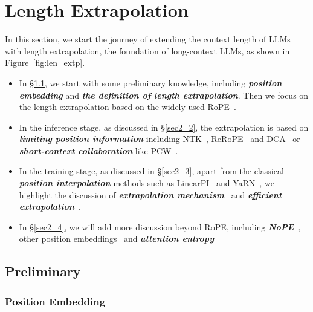 \section{Length Extrapolation}\label{sec2}



In this section, we start the journey of extending the context length of LLMs with length extrapolation, the foundation of long-context LLMs, as shown in Figure~\ref{fig:len_extp}. 
\begin{itemize}
    \item In \S\ref{sec2_1}, we start with some preliminary knowledge, including \textbf{\textit{position embedding}} and \textbf{\textit{the definition of length extrapolation}}. Then we focus on the length extrapolation based on the widely-used RoPE~\citep{su2024roformer}. 
    \item In the inference stage, as discussed in \S\ref{sec2_2}, the extrapolation is based on \textbf{\textit{limiting position information}} including NTK~\citep{dynamicNTK}, ReRoPE~\citep{rerope} and DCA~\citep{an2024training} or \textbf{\textit{short-context collaboration}} like PCW~\citep{ratner2022parallel}. 
    \item In the training stage, as discussed in \S\ref{sec2_3}, apart from the classical \textbf{\textit{position interpolation}} methods such as LinearPI~\citep{chen2023extending} and YaRN~\citep{pengyarn}, we highlight the discussion of \textbf{\textit{extrapolation mechanism}}~\citep{liuscaling,men2024base} and \textbf{\textit{efficient extrapolation}}~\citep{chenlonglora,zhu2023pose}.
    \item  In \S\ref{sec2_4}, we will add more discussion beyond RoPE, including \textbf{\textit{NoPE}}~\citep{kazemnejad2024impact}, other position embeddings~\citep{golovneva2024contextual,dong2024exploring} and \textbf{\textit{attention entropy}}~\citep{han2024lm,zhang2024extending} 
\end{itemize}

\subsection{Preliminary}\label{sec2_1}

\subsubsection{Position Embedding}


